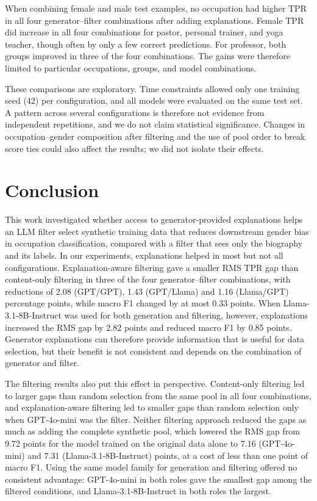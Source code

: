 \documentclass[sigconf]{acmart}
\begin{document}
When combining female and male test examples, no occupation had higher TPR in all four generator--filter combinations after adding explanations. Female TPR did increase in all four combinations for pastor, personal trainer, and yoga teacher, though often by only a few correct predictions. For professor, both groups improved in three of the four combinations. The gains were therefore limited to particular occupations, groups, and model combinations.

These comparisons are exploratory. Time constraints allowed only one training seed (42) per configuration, and all models were evaluated on the same test set. A pattern across several configurations is therefore not evidence from independent repetitions, and we do not claim statistical significance. Changes in occupation--gender composition after filtering and the use of pool order to break score ties could also affect the results; we did not isolate their effects.

\section{Conclusion}
\label{sec:conclusion}

This work investigated whether access to generator-provided explanations helps an LLM filter select synthetic training data that reduces downstream gender bias in occupation classification, compared with a filter that sees only the biography and its labels. In our experiments, explanations helped in most but not all configurations. Explanation-aware filtering gave a smaller RMS TPR gap than content-only filtering in three of the four generator--filter combinations, with reductions of 2.08 (GPT/GPT), 1.43 (GPT/Llama) and 1.16 (Llama/GPT) percentage points, while macro F1 changed by at most 0.33 points. When Llama-3.1-8B-Instruct was used for both generation and filtering, however, explanations increased the RMS gap by 2.82 points and reduced macro F1 by 0.85 points. Generator explanations can therefore provide information that is useful for data selection, but their benefit is not consistent and depends on the combination of generator and filter.

The filtering results also put this effect in perspective. Content-only filtering led to larger gaps than random selection from the same pool in all four combinations, and explanation-aware filtering led to smaller gaps than random selection only when GPT-4o-mini was the filter. Neither filtering approach reduced the gaps as much as adding the complete synthetic pool, which lowered the RMS gap from 9.72 points for the model trained on the original data alone to 7.16 (GPT-4o-mini) and 7.31 (Llama-3.1-8B-Instruct) points, at a cost of less than one point of macro F1. Using the same model family for generation and filtering offered no consistent advantage: GPT-4o-mini in both roles gave the smallest gap among the filtered conditions, and Llama-3.1-8B-Instruct in both roles the largest.
\end{document}
